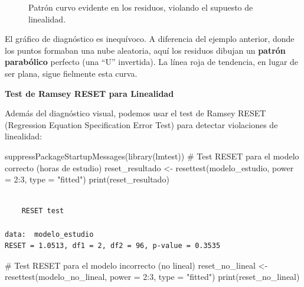 \documentclass[
  letterpaper,
  DIV=11,
  numbers=noendperiod]{scrreprt}
\newenvironment{Shaded}{\begin{snugshade}}{\end{snugshade}}
\newcommand{\AttributeTok}[1]{\textcolor[rgb]{0.40,0.45,0.13}{#1}}
\newcommand{\CommentTok}[1]{\textcolor[rgb]{0.37,0.37,0.37}{#1}}
\newcommand{\DecValTok}[1]{\textcolor[rgb]{0.68,0.00,0.00}{#1}}
\newcommand{\FunctionTok}[1]{\textcolor[rgb]{0.28,0.35,0.67}{#1}}
\newcommand{\NormalTok}[1]{\textcolor[rgb]{0.00,0.23,0.31}{#1}}
\newcommand{\OtherTok}[1]{\textcolor[rgb]{0.00,0.23,0.31}{#1}}
\newcommand{\SpecialCharTok}[1]{\textcolor[rgb]{0.37,0.37,0.37}{#1}}
\newcommand{\StringTok}[1]{\textcolor[rgb]{0.13,0.47,0.30}{#1}}
\begin{document}
\begin{tcolorbox}
\begin{figure}[H]
{}

\caption{\label{fig-linealidad-mal}Patrón curvo evidente en los
residuos, violando el supuesto de linealidad.}

\end{figure}%

El gráfico de diagnóstico es inequívoco. A diferencia del ejemplo
anterior, donde los puntos formaban una nube aleatoria, aquí los
residuos dibujan un \textbf{patrón parabólico} perfecto (una ``U''
invertida). La línea roja de tendencia, en lugar de ser plana, sigue
fielmente esta curva.

\textbf{Test de Ramsey RESET para Linealidad}

Además del diagnóstico visual, podemos usar el test de Ramsey RESET
(Regression Equation Specification Error Test) para detectar violaciones
de linealidad:

\begin{Shaded}
\begin{Highlighting}[]
\FunctionTok{suppressPackageStartupMessages}\NormalTok{(}\FunctionTok{library}\NormalTok{(lmtest))}
\CommentTok{\# Test RESET para el modelo correcto (horas de estudio)}
\NormalTok{reset\_resultado }\OtherTok{\textless{}{-}} \FunctionTok{resettest}\NormalTok{(modelo\_estudio, }\AttributeTok{power =} \DecValTok{2}\SpecialCharTok{:}\DecValTok{3}\NormalTok{, }\AttributeTok{type =} \StringTok{"fitted"}\NormalTok{)}
\FunctionTok{print}\NormalTok{(reset\_resultado)}
\end{Highlighting}
\end{Shaded}

\begin{verbatim}

    RESET test

data:  modelo_estudio
RESET = 1.0513, df1 = 2, df2 = 96, p-value = 0.3535
\end{verbatim}

\begin{Shaded}
\begin{Highlighting}[]
\CommentTok{\# Test RESET para el modelo incorrecto (no lineal)}
\NormalTok{reset\_no\_lineal }\OtherTok{\textless{}{-}} \FunctionTok{resettest}\NormalTok{(modelo\_no\_lineal, }\AttributeTok{power =} \DecValTok{2}\SpecialCharTok{:}\DecValTok{3}\NormalTok{, }\AttributeTok{type =} \StringTok{"fitted"}\NormalTok{)}
\FunctionTok{print}\NormalTok{(reset\_no\_lineal)}
\end{Highlighting}
\end{Shaded}


\end{tcolorbox}
\end{document}
